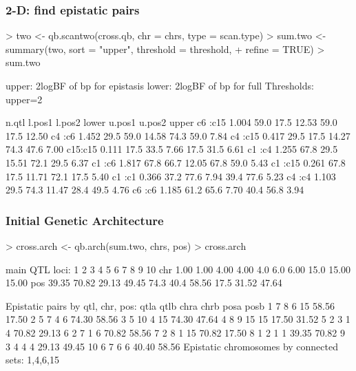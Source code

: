 \documentclass{beamer}
\begin{document}
\begin{frame}[fragile]
  \frametitle{2-D: find epistatic pairs}

\tiny

\begin{Schunk}
\begin{Sinput}
> two <- qb.scantwo(cross.qb, chr = chrs, type = scan.type)
> sum.two <- summary(two, sort = "upper", threshold = threshold, 
+     refine = TRUE)
> sum.two
\end{Sinput}
\begin{Soutput}
upper: 2logBF of bp for epistasis
lower: 2logBF of bp for full 
Thresholds: upper=2 

        n.qtl l.pos1 l.pos2 lower u.pos1 u.pos2 upper
c6 :c15 1.004   59.0   17.5 12.53   59.0   17.5 12.50
c4 :c6  1.452   29.5   59.0 14.58   74.3   59.0  7.84
c4 :c15 0.417   29.5   17.5 14.27   74.3   47.6  7.00
c15:c15 0.111   17.5   33.5  7.66   17.5   31.5  6.61
c1 :c4  1.255   67.8   29.5 15.51   72.1   29.5  6.37
c1 :c6  1.817   67.8   66.7 12.05   67.8   59.0  5.43
c1 :c15 0.261   67.8   17.5 11.71   72.1   17.5  5.40
c1 :c1  0.366   37.2   77.6  7.94   39.4   77.6  5.23
c4 :c4  1.103   29.5   74.3 11.47   28.4   49.5  4.76
c6 :c6  1.185   61.2   65.6  7.70   40.4   56.8  3.94
\end{Soutput}
\end{Schunk}

\end{frame}

\begin{frame}[fragile]
  \frametitle{Initial Genetic Architecture}

\tiny

\begin{Schunk}
\begin{Sinput}
> cross.arch <- qb.arch(sum.two, chrs, pos)
> cross.arch
\end{Sinput}
\begin{Soutput}
main QTL loci:
        1     2     3     4    5    6     7    8     9    10
chr  1.00  1.00  4.00  4.00  4.0  6.0  6.00 15.0 15.00 15.00
pos 39.35 70.82 29.13 49.45 74.3 40.4 58.56 17.5 31.52 47.64

Epistatic pairs by qtl, chr, pos:
   qtla qtlb chra chrb  posa  posb
1     7    8    6   15 58.56 17.50
2     5    7    4    6 74.30 58.56
3     5   10    4   15 74.30 47.64
4     8    9   15   15 17.50 31.52
5     2    3    1    4 70.82 29.13
6     2    7    1    6 70.82 58.56
7     2    8    1   15 70.82 17.50
8     1    2    1    1 39.35 70.82
9     3    4    4    4 29.13 49.45
10    6    7    6    6 40.40 58.56
Epistatic chromosomes by connected sets:
1,4,6,15 
\end{Soutput}
\end{Schunk}

\end{frame}
 
\end{document}
